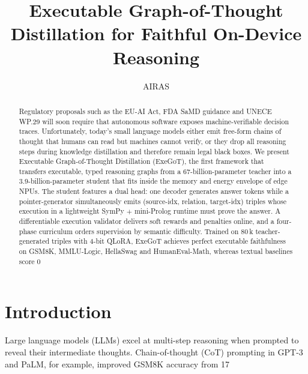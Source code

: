 \documentclass{article} %
\title{Executable Graph-of-Thought Distillation for Faithful On-Device Reasoning}
\author{AIRAS}
\begin{document}
\maketitle

\begin{abstract}
Regulatory proposals such as the EU-AI Act, FDA SaMD guidance and UNECE WP.29 will soon require that autonomous software exposes machine-verifiable decision traces. Unfortunately, today’s small language models either emit free-form chains of thought that humans can read but machines cannot verify, or they drop all reasoning steps during knowledge distillation and therefore remain legal black boxes. We present Executable Graph-of-Thought Distillation (ExeGoT), the first framework that transfers executable, typed reasoning graphs from a 67-billion-parameter teacher into a 3.9-billion-parameter student that fits inside the memory and energy envelope of edge NPUs. The student features a dual head: one decoder generates answer tokens while a pointer-generator simultaneously emits (source-idx, relation, target-idx) triples whose execution in a lightweight SymPy $+$ mini-Prolog runtime must prove the answer. A differentiable execution validator delivers soft rewards and penalties online, and a four-phase curriculum orders supervision by semantic difficulty. Trained on 80\,k teacher-generated triples with 4-bit QLoRA, ExeGoT achieves perfect executable faithfulness on GSM8K, MMLU-Logic, HellaSwag and HumanEval-Math, whereas textual baselines score 0\,%
\end{abstract}

\section{Introduction}
\label{sec:intro}
Large language models (LLMs) excel at multi-step reasoning when prompted to reveal their intermediate thoughts. Chain-of-thought (CoT) prompting in GPT-3 and PaLM, for example, improved GSM8K accuracy from 17\,%
\end{document}
